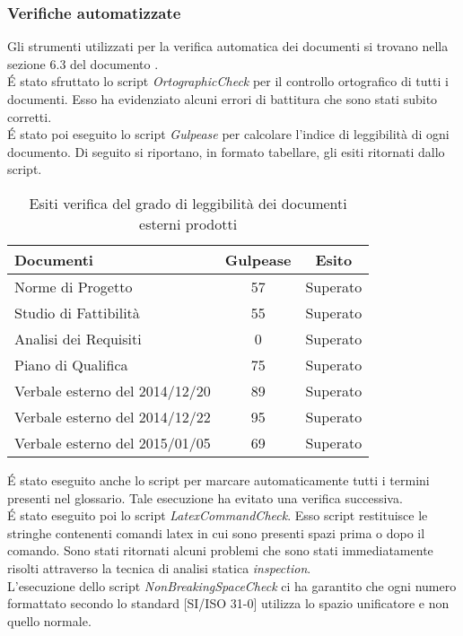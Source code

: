 			\subsubsection{Verifiche automatizzate}
				Gli strumenti utilizzati per la verifica automatica dei documenti si trovano nella sezione 6.3 del documento .\\
				É stato sfruttato lo script \textit{OrtographicCheck} per  il controllo ortografico di tutti i documenti. Esso ha evidenziato alcuni errori di battitura che sono stati subito corretti.\\
				É stato poi eseguito lo script \textit{Gulpease} per calcolare l'indice di leggibilità di ogni documento. Di seguito si riportano, in formato tabellare, gli esiti ritornati dallo script.
				\begin{table}[H]\centering
						\begin{tabu}{| l | c | c |}
							\hline
							Documenti 				& Gulpease	& Esito  \\ \hline
							
							Norme di Progetto 			& 57		& Superato 		 \\
							Studio di Fattibilità 			& 55		& Superato 		 \\
							Analisi dei Requisiti	 			& 0		& Superato 		 \\
							Piano di Qualifica 			& 75		& Superato 	 \\
							Verbale esterno del 2014/12/20 			& 89 		& Superato	\\
							Verbale esterno del 2014/12/22	 	& 95		& Superato 	\\ 
							Verbale esterno del 2015/01/05	& 69		& Superato\\ \hline 
						\end{tabu}
					\caption{Esiti verifica del grado di leggibilità dei documenti esterni prodotti}
				\end{table}
				É stato eseguito anche lo script per marcare automaticamente tutti i termini presenti nel glossario. Tale esecuzione ha evitato una verifica successiva.\\
				É stato eseguito poi lo script \textit{LatexCommandCheck}. Esso script restituisce le stringhe contenenti comandi latex in cui sono presenti spazi prima o dopo il comando. Sono stati ritornati alcuni problemi che sono stati immediatamente risolti attraverso la tecnica di analisi statica \textit{inspection}.\\
				L'esecuzione dello script \textit{NonBreakingSpaceCheck} ci ha garantito che ogni numero formattato secondo lo standard [SI/ISO 31-0] utilizza lo spazio unificatore e non quello normale.